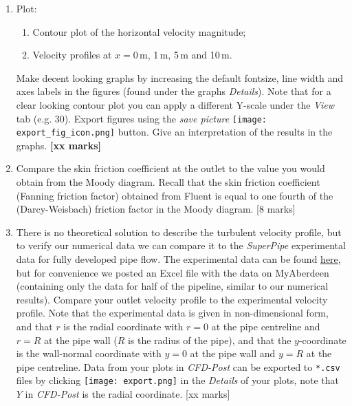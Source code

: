 \documentclass[11pt,a4paper,oneside]{scrartcl}
\begin{document}
\begin{enumerate}
\item Plot:
  \begin{enumerate}
    \item Contour plot of the horizontal velocity magnitude;
    \item Velocity profiles at $x=0$\,m, 1\,m, 5\,m and 10\,m.
  \end{enumerate}
  Make decent looking graphs by increasing the default fontsize, line width and axes labels in the figures (found under the graphs \emph{Details}). Note that for a clear looking contour plot you can apply a different Y-scale under the \emph{View} tab (e.g. 30). Export figures using the \emph{save picture} \texttt{[image: export\_fig\_icon.png]} button. Give an interpretation of the results in the graphs. {\bf [xx marks]}
\item Compare the skin friction coefficient at the outlet to the value you would obtain from the Moody diagram. Recall that the skin friction coefficient (Fanning friction factor) obtained from Fluent is equal to one fourth of the (Darcy-Weisbach) friction factor in the Moody diagram. [8 marks]
\item There is no theoretical solution to describe the turbulent velocity profile, but to verify our numerical data we can compare it to the \emph{SuperPipe} experimental data for fully developed pipe flow. The experimental data can be found  \href{http://www.princeton.edu/~gasdyn/Superpipe_data/3.1577E+04.txt}{\underline{here}}, but for convenience we posted an Excel file with the data on MyAberdeen (containing only the data for half of the pipeline, similar to our numerical results). Compare your outlet velocity profile to the experimental velocity profile. Note that the experimental data is given in non-dimensional form, and that $r$ is the radial coordinate with $r=0$ at the pipe centreline and $r=R$ at the pipe wall ($R$ is the radius of the pipe), and that the $y$-coordinate is the wall-normal coordinate with $y=0$ at the pipe wall and $y=R$ at the pipe centreline. Data from your plots in \emph{CFD-Post} can be exported to \texttt{*.csv} files by clicking \texttt{[image: export.png]} in the \emph{Details} of your plots, note that $Y$ in \emph{CFD-Post} is the radial coordinate. [xx marks]
\end{enumerate}
\end{document}
